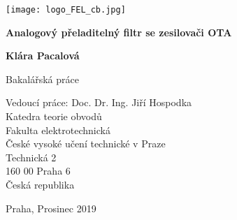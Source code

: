 \begin{titlepage}
    \begin{center}
    
        \texttt{[image: logo\_FEL\_cb.jpg]}
            
        \vspace*{3cm}
 
        \Huge
        \textbf{Analogový přeladitelný filtr se zesilovači OTA}
 
        \vspace{0.5cm}
 
        \vspace{1.5cm}
 
        \textbf{Klára Pacalová}
 
        \vfill
 
        Bakalářská práce
 
        \vspace{0.8cm}
 		
        \Large
 		Vedoucí práce: Doc. Dr. Ing. Jiří Hospodka\\
    		Katedra teorie obvodů\\
		Fakulta elektrotechnická\\
		České vysoké učení technické v Praze\\
		Technická 2\\
		160 00 Praha 6\\
		Česká republika
		
		\vspace{1.5cm}
		        
		Praha, Prosinec 2019
 
    \end{center}
\end{titlepage}